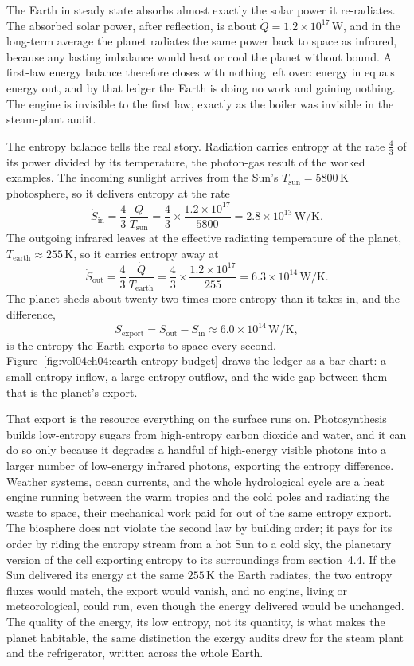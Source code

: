 The Earth in steady state absorbs almost exactly the solar power it re-radiates.
The absorbed solar power, after reflection, is about $\dot Q = 1.2\times10^{17}\,
\text{W}$, and in the long-term average the planet radiates the same power back to
space as infrared, because any lasting imbalance would heat or cool the planet
without bound. A first-law energy balance therefore closes with nothing left over:
energy in equals energy out, and by that ledger the Earth is doing no work and
gaining nothing. The engine is invisible to the first law, exactly as the boiler
was invisible in the steam-plant audit.

The entropy balance tells the real story. Radiation carries entropy at the rate
$\tfrac43$ of its power divided by its temperature, the photon-gas result of the
worked examples. The incoming sunlight arrives from the Sun's $T_{\text{sun}} =
5800\,\si{\kelvin}$ photosphere, so it delivers entropy at the rate
\[
\dot S_{\text{in}} = \frac{4}{3}\,\frac{\dot Q}{T_{\text{sun}}}
= \frac{4}{3}\times\frac{1.2\times10^{17}}{5800}
= 2.8\times10^{13}\,\si{\watt\per\kelvin}.
\]
The outgoing infrared leaves at the effective radiating temperature of the planet,
$T_{\text{earth}} \approx 255\,\si{\kelvin}$, so it carries entropy away at
\[
\dot S_{\text{out}} = \frac{4}{3}\,\frac{\dot Q}{T_{\text{earth}}}
= \frac{4}{3}\times\frac{1.2\times10^{17}}{255}
= 6.3\times10^{14}\,\si{\watt\per\kelvin}.
\]
The planet sheds about twenty-two times more entropy than it takes in, and the
difference,
\[
\dot S_{\text{export}} = \dot S_{\text{out}} - \dot S_{\text{in}}
\approx 6.0\times10^{14}\,\si{\watt\per\kelvin},
\]
is the entropy the Earth exports to space every second.
Figure~\ref{fig:vol04ch04:earth-entropy-budget} draws the ledger as a bar chart:
a small entropy inflow, a large entropy outflow, and the wide gap between them
that is the planet's export.

That export is the resource everything on the surface runs on. Photosynthesis
builds low-entropy sugars from high-entropy carbon dioxide and water, and it can
do so only because it degrades a handful of high-energy visible photons into a
larger number of low-energy infrared photons, exporting the entropy difference.
Weather systems, ocean currents, and the whole hydrological cycle are a heat
engine running between the warm tropics and the cold poles and radiating the waste
to space, their mechanical work paid for out of the same entropy export. The
biosphere does not violate the second law by building order; it pays for its order
by riding the entropy stream from a hot Sun to a cold sky, the planetary version
of the cell exporting entropy to its surroundings from section~4.4. If the Sun
delivered its energy at the same $255\,\si{\kelvin}$ the Earth radiates, the two
entropy fluxes would match, the export would vanish, and no engine, living or
meteorological, could run, even though the energy delivered would be unchanged.
The quality of the energy, its low entropy, not its quantity, is what makes the
planet habitable, the same distinction the exergy audits drew for the steam plant
and the refrigerator, written across the whole Earth.

